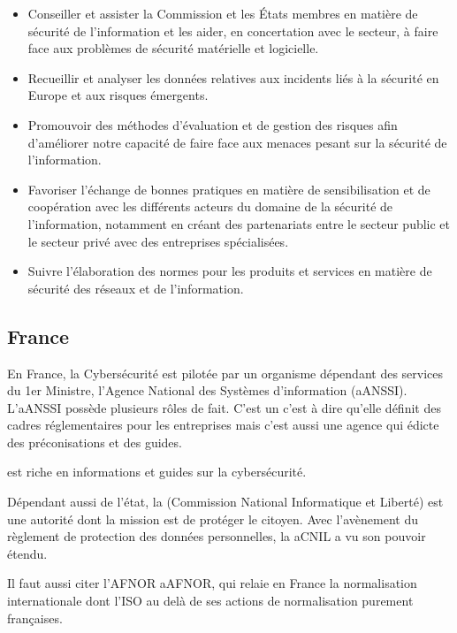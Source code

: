 \begin{itemize}
  \item Conseiller et assister la Commission et les États membres en matière de sécurité de l'information et les aider, en concertation avec le secteur, à faire face aux problèmes de sécurité matérielle et logicielle.
  \item Recueillir et analyser les données relatives aux incidents liés à la sécurité en Europe et aux risques émergents.
  \item Promouvoir des méthodes d'évaluation et de gestion des risques afin d'améliorer notre capacité de faire face aux menaces pesant sur la sécurité de l'information.
  \item Favoriser l'échange de bonnes pratiques en matière de sensibilisation et de coopération avec les différents acteurs du domaine de la sécurité de l'information, notamment en créant des partenariats entre le secteur public et le secteur privé avec des entreprises spécialisées.
  \item Suivre l'élaboration des normes pour les produits et services en matière de sécurité des réseaux et de l'information.
\end{itemize}

\subsection{France}

En France, la Cybersécurité est pilotée par un organisme dépendant des services du 1er Ministre,  l'Agence National des Systèmes d'information (\gls{aANSSI}).
L'\gls{aANSSI} possède plusieurs rôles de fait. C'est un  c'est à dire qu'elle définit des cadres réglementaires pour les entreprises mais c'est aussi une agence qui édicte des préconisations et des guides.

  est riche en informations et guides sur la cybersécurité.

Dépendant aussi de l'état, la  (Commission National Informatique et Liberté) est une autorité dont la mission est de protéger le citoyen. Avec l'avènement du règlement de protection des données personnelles, la \gls{aCNIL} a vu son pouvoir étendu.  

Il faut aussi citer l'AFNOR \gls{aAFNOR}, qui relaie en France la normalisation internationale dont l'ISO au delà de ses actions de normalisation purement françaises.

